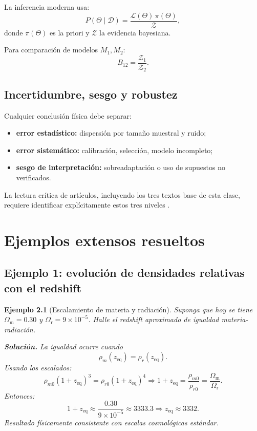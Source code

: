 \documentclass[12pt,oneside]{book}
\newtheorem{ejemplo}{Ejemplo}[chapter]
\newcommand{\OmM}{\Omega_{\mathrm{m}}}
\newcommand{\OmR}{\Omega_{\mathrm{r}}}
\begin{document}
La inferencia moderna usa:
\begin{equation}
  P(\Theta\mid\mathcal{D})=\frac{\mathcal{L}(\Theta)\,\pi(\Theta)}{\mathcal{Z}},
\end{equation}
donde $\pi(\Theta)$ es la priori y $\mathcal{Z}$ la evidencia bayesiana.

Para comparación de modelos $M_1,M_2$:
\begin{equation}
  B_{12}=\frac{\mathcal{Z}_1}{\mathcal{Z}_2}.
\end{equation}

\section{Incertidumbre, sesgo y robustez}

Cualquier conclusión física debe separar:
\begin{itemize}[leftmargin=1.5em]
  \item \textbf{error estadístico:} dispersión por tamaño muestral y ruido;
  \item \textbf{error sistemático:} calibración, selección, modelo incompleto;
  \item \textbf{sesgo de interpretación:} sobreadaptación o uso de supuestos no verificados.
\end{itemize}

La lectura crítica de artículos, incluyendo los tres textos base de esta clase,
requiere identificar explícitamente estos tres niveles \citep{trotta2008,wall2012}.

\chapter{Ejemplos extensos resueltos}

\section{Ejemplo 1: evolución de densidades relativas con el redshift}

\begin{ejemplo}[Escalamiento de materia y radiación]
Suponga que hoy se tiene $\OmM=0.30$ y $\OmR=9\times10^{-5}$. Halle el redshift
aproximado de igualdad materia-radiación.

\textbf{Solución.}
La igualdad ocurre cuando
\begin{equation}
  \rho_m(z_{\mathrm{eq}})=\rho_r(z_{\mathrm{eq}}).
\end{equation}
Usando los escalados:
\begin{equation}
  \rho_{m0}(1+z_{\mathrm{eq}})^3=\rho_{r0}(1+z_{\mathrm{eq}})^4
  \Rightarrow 1+z_{\mathrm{eq}}=\frac{\rho_{m0}}{\rho_{r0}}=\frac{\OmM}{\OmR}.
\end{equation}
Entonces:
\begin{equation}
  1+z_{\mathrm{eq}}\approx\frac{0.30}{9\times10^{-5}}\approx3333.3
  \Rightarrow z_{\mathrm{eq}}\approx3332.
\end{equation}
Resultado físicamente consistente con escalas cosmológicas estándar.
\end{ejemplo}
\end{document}
